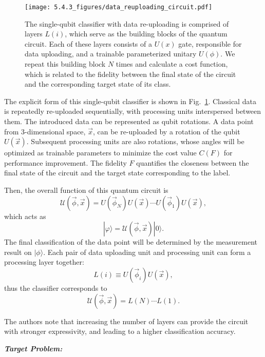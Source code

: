 \begin{figure}[h]
    \begin{center}
        \texttt{[image: 5.4.3\_figures/data\_reuploading\_circuit.pdf]}
    \end{center}
    \captionsetup{justification=raggedright,singlelinecheck=false}
    \caption{The single-qubit classifier with data re-uploading is comprised of layers $L(i)$, which serve as the building blocks of the quantum circuit. Each of these layers consists of a $U(x)$ gate, responsible for data uploading, and a trainable parameterized unitary $U(\phi)$. We repeat this building block $N$ times and calculate a cost function, which is related to the fidelity between the final state of the circuit and the corresponding target state of its class.}
    \label{data_reuploading_circuit}
\end{figure}

The explicit form of this single-qubit classifier is
shown in Fig.~\ref{data_reuploading_circuit}. Classical data is repeatedly re-uploaded sequentially, with processing units interspersed between them. The introduced data can be represented as qubit rotations. A data point from 3-dimensional space, $\overrightarrow{x}$, can be re-uploaded by a rotation of the qubit $U(\overrightarrow{x})$. Subsequent processing units are also rotations, whose angles will be optimized as trainable parameters to minimize the cost value $C(F)$ for performance improvement. The fidelity $F$ quantifies the closeness between the final state of the circuit and the target state corresponding to the label.

Then, the overall function of this quantum circuit is
$$\mathcal{U}(\overrightarrow{\phi},\overrightarrow{x})=U(\overrightarrow{\phi}_N)U(\overrightarrow{x})\cdots U(\overrightarrow{\phi}_1)U(\overrightarrow{x}),$$
which acts as
$$|\varphi\rangle=\mathcal{U}(\overrightarrow{\phi},\overrightarrow{x})|0\rangle.$$
The final classification of the data point will be determined by the measurement result on $|\phi\rangle$. Each pair of data uploading unit and processing unit can form a processing layer together:
$$L(i)\equiv U(\overrightarrow{\phi}_i)U(\overrightarrow{x}),$$
thus the classifier corresponds to
$$\mathcal{U}(\overrightarrow{\phi},\overrightarrow{x})=L(N)\cdots L(1).$$

The authors note that increasing the number of layers can provide the circuit with stronger expressivity, and leading to a higher classification accuracy.

\textbf{\textit{Target Problem:}}

